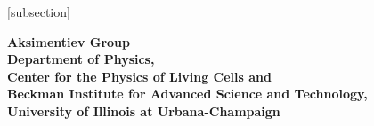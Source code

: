 \documentclass[letterpaper]{article}
\begin{document}
[subsection]
\pagestyle{headings}


\topmargin 22pt
\footskip 27pt


 



\thispagestyle{empty}
{\bfseries \noindent Aksimentiev Group\\
Department of Physics,\\
Center for the Physics of Living Cells and\\
Beckman Institute for Advanced Science and Technology,\\
University of Illinois at Urbana-Champaign
}
\end{document}
